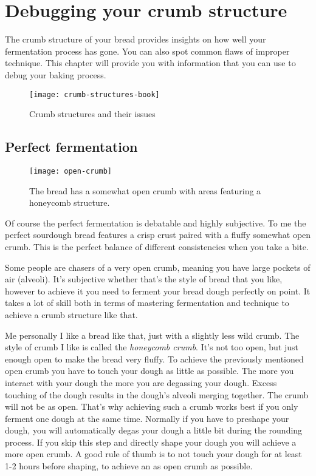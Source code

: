 \section{Debugging your crumb structure}

The crumb structure of your bread provides insights on how well
your fermentation process has gone. You can also spot common flaws
of improper technique. This chapter will provide you with information
that you can use to debug your baking process.

\begin{figure}
  \texttt{[image: crumb-structures-book]}
  \caption{Crumb structures and their issues}
  \label{fig:crumb-structures-book}
\end{figure}

\subsection{Perfect fermentation}

\begin{figure}
  \texttt{[image: open-crumb]}
  \caption{The bread has a somewhat open crumb with areas
  featuring a honeycomb structure.}
  \label{fig:open-crumb}
\end{figure}

Of course the perfect fermentation is debatable and highly subjective. To
me the perfect sourdough bread features a crisp crust paired with a fluffy
somewhat open crumb. This is the perfect balance of different consistencies
when you take a bite.

Some people are chasers of a very open crumb, meaning you have large pockets
of air (alveoli). It's subjective whether that's the style of bread that you like,
however to achieve it you need to ferment your bread dough perfectly on point.
It takes a lot of skill both in terms of mastering fermentation and technique
to achieve a crumb structure like that.

Me personally I like a bread like that, just with a slightly less wild crumb.
The style of crumb I like is called the {\it honeycomb crumb}. It's not too open, but
just enough open to make the bread very fluffy. To achieve the previously mentioned open crumb you
have to touch your dough as little as possible. The more you interact with your
dough the more you are degassing your dough. Excess touching of the dough
results in the dough's alveoli merging together. The crumb will not be as open.
That's why achieving such a crumb works best if you only ferment
one dough at the same time. Normally if you have to preshape your dough,
you will automatically degas your dough a little bit during the rounding process.
If you skip this step and directly shape your dough you will achieve a more open crumb.
A good rule of thumb is to not touch your dough for at least 1-2 hours before shaping,
to achieve an as open crumb as possible.

